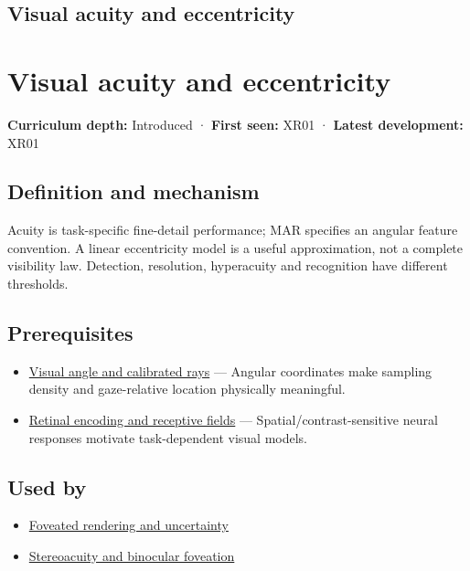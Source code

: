 \hypertarget{appendix-b491fc48c54b}{}
\section*{Visual acuity and eccentricity}
\chapter{Visual acuity and eccentricity}\label{appendix-b491fc48c54b-visual-acuity-and-eccentricity}

\textbf{Curriculum depth:} Introduced · \textbf{First seen:} XR01 · \textbf{Latest development:} XR01

\section{Definition and mechanism}\label{appendix-b491fc48c54b-definition-and-mechanism}

Acuity is task-specific fine-detail performance; MAR specifies an angular feature convention. A linear eccentricity model is a useful approximation, not a complete visibility law. Detection, resolution, hyperacuity and recognition have different thresholds.

\section{Prerequisites}\label{appendix-b491fc48c54b-prerequisites}

\begin{itemize}
\tightlist
\item
  \hyperref[appendix-7d356c396d1a]{Visual angle and calibrated rays} --- Angular coordinates make sampling density and gaze-relative location physically meaningful.
\item
  \hyperref[appendix-7281c15ac44a]{Retinal encoding and receptive fields} --- Spatial/contrast-sensitive neural responses motivate task-dependent visual models.
\end{itemize}

\section{Used by}\label{appendix-b491fc48c54b-used-by}

\begin{itemize}
\tightlist
\item
  \hyperref[appendix-5878b813b732]{Foveated rendering and uncertainty}
\item
  \hyperref[appendix-8dc848f14052]{Stereoacuity and binocular foveation}
\end{itemize}

